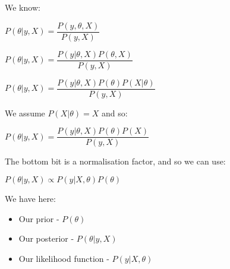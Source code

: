 We know:

\(P(\theta |y,X)=\dfrac{P(y, \theta, X )}{P(y, X)}\)

\(P(\theta |y,X)=\dfrac{P(y| \theta, X )P(\theta, X)}{P(y, X)}\)

\(P(\theta |y,X)=\dfrac{P(y| \theta, X )P(\theta )P(X|\theta )}{P(y, X)}\)

We assume \(P(X|\theta )=X\) and so:

\(P(\theta |y,X)=\dfrac{P(y| \theta, X )P(\theta )P(X)}{P(y, X)}\)

The bottom bit is a normalisation factor, and so we can use:

\(P(\theta |y,X)\propto P(y| X, \theta)P(\theta)\)

We have here:

\begin{itemize}
\item Our prior - \(P(\theta )\)
\item Our posterior - \(P(\theta |y,X)\)
\item Our likelihood function - \(P(y| X, \theta )\)
\end{itemize}

